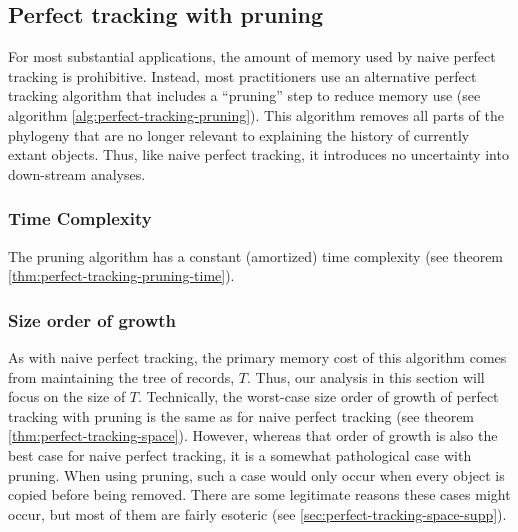 

\subsection{Perfect tracking with pruning}

For most substantial applications, the amount of memory used by naive perfect tracking is prohibitive.
Instead, most practitioners use an alternative perfect tracking algorithm that includes a ``pruning'' step to reduce memory use (see algorithm \ref{alg:perfect-tracking-pruning}).
This algorithm removes all parts of the phylogeny that are no longer relevant to explaining the history of currently extant objects.
Thus, like naive perfect tracking, it introduces no uncertainty into down-stream analyses.



\subsubsection{Time Complexity}

The pruning algorithm has a constant (amortized) time complexity (see theorem \ref{thm:perfect-tracking-pruning-time}). 



\subsubsection{Size order of growth}

As with naive perfect tracking, the primary memory cost of this algorithm comes from maintaining the tree of records, $T$.
Thus, our analysis in this section will focus on the size of $T$.
Technically, the worst-case size order of growth of perfect tracking with pruning is the same as for naive perfect tracking (see theorem \ref{thm:perfect-tracking-space}).
However, whereas that order of growth is also the best case for naive perfect tracking, it is a somewhat pathological case with pruning.
When using pruning, such a case would only occur when every object is copied before being removed.
There are some legitimate reasons these cases might occur, but most of them are fairly esoteric (see \ref{sec:perfect-tracking-space-supp}).


